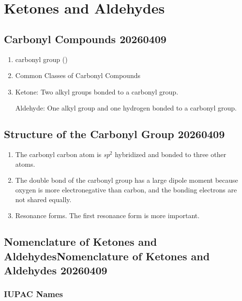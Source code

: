 \section{Ketones and Aldehydes}

\subsection{Carbonyl Compounds 20260409}

\begin{enumerate}
    \item carbonyl group ()
    \item Common Classes of Carbonyl Compounds %
    \item Ketone: Two alkyl groups bonded to a carbonyl group.
    
    Aldehyde: One alkyl group and one hydrogen bonded to a carbonyl group.
\end{enumerate}

\subsection{Structure of the Carbonyl Group 20260409}

\begin{enumerate}
    \item The carbonyl carbon atom is \textit{sp}$^2$ hybridized and bonded to three other atoms.
    \item The double bond of the carbonyl group has a large dipole moment because oxygen is more electronegative than carbon, and the bonding electrons are not shared equally.
    \item Resonance forms. The first resonance form is more important. %
\end{enumerate}

\subsection{Nomenclature of Ketones and AldehydesNomenclature of Ketones and Aldehydes 20260409}

\subsubsection{IUPAC Names}

